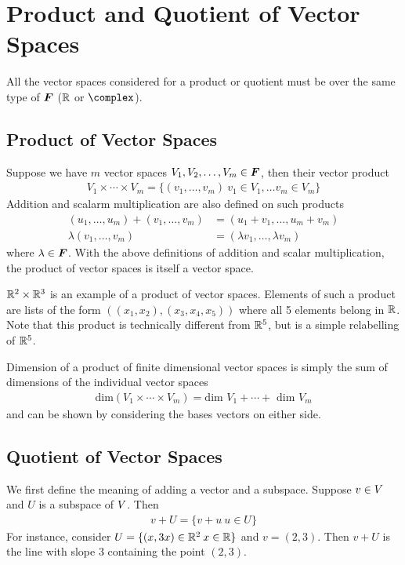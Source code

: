 \documentclass[../../linear_algebra.tex]{subfiles}
\begin{document}
\section{Product and Quotient of Vector Spaces}
All the vector spaces considered for a product or quotient must be over the same type of $\bm{F}$ ($\mathbb{R}$ or $\complex$).\newline


\subsection{Product of Vector Spaces}
Suppose we have $m$ vector spaces $V_{1}, V_{2}, \ldots, V_{m} \in \bm{F}$, then their vector product
\begin{align*}
    V_{1}\times \cdots \times V_{m} = \{ (v_{1}, \ldots, v_{m}) \: v_{1}\in V_{1}, \ldots v_{m} \in V_{m} \}
\end{align*}
Addition and scalarm multiplication are also defined on such products
\begin{align*}
    (u_{1}, \ldots, u_{m}) + (v_{1}, \ldots, v_{m}) &= (u_{1} + v_{1}, \ldots, u_{m} + v_{m})\\
    \lambda (v_{1}, \ldots, v_{m}) &= (\lambda v_{1}, \ldots, \lambda v_{m})
\end{align*}
where $\lambda \in \bm{F}$. With the above definitions of addition and scalar multiplication, the product of vector spaces is itself a vector space.\newline

$\mathbb{R}^{2} \times \mathbb{R}^{3}$ is an example of a product of vector spaces. Elements of such a product are lists of the form $((x_{1}, x_{2}), (x_{3}, x_{4}, x_{5}))$ where all 5 elements belong in $\mathbb{R}$. Note that this product is technically different from $\mathbb{R}^{5}$, but is a simple relabelling of $\mathbb{R}^{5}$.\newline

Dimension of a product of finite dimensional vector spaces is simply the sum of dimensions of the individual vector spaces
\begin{align*}
    \text{dim}(V_{1} \times \cdots \times V_{m}) = \text{dim }V_{1} + \cdots + \text{ dim }V_{m}
\end{align*}
and can be shown by considering the bases vectors on either side.


\subsection{Quotient of Vector Spaces}
We first define the meaning of adding a vector and a subspace. Suppose $v \in V$ and $U$ is a subspace of $V$. Then
\begin{align*}
    v + U = \{ v + u \: u \in U \}
\end{align*}
For instance, consider $U = \{(x, 3x) \in \mathbb{R}^{2} \: x \in \mathbb{R} \}$ and $v = (2,3)$. Then $v + U$ is the line with slope $3$ containing the point $(2,3)$.\newline
\end{document}
